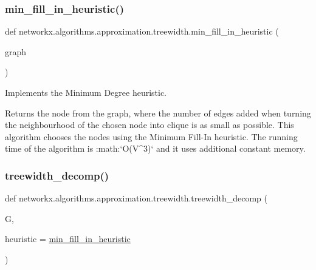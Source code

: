 \subsubsection{\texorpdfstring{min\+\_\+fill\+\_\+in\+\_\+heuristic()}{min\_fill\_in\_heuristic()}}
{\footnotesize\ttfamily def networkx.\+algorithms.\+approximation.\+treewidth.\+min\+\_\+fill\+\_\+in\+\_\+heuristic (\begin{DoxyParamCaption}\item[{}]{graph }\end{DoxyParamCaption})}

\begin{DoxyVerb}Implements the Minimum Degree heuristic.

Returns the node from the graph, where the number of edges added when
turning the neighbourhood of the chosen node into clique is as small as
possible. This algorithm chooses the nodes using the Minimum Fill-In
heuristic. The running time of the algorithm is :math:`O(V^3)` and it uses
additional constant memory.\end{DoxyVerb}
 \mbox{\label{namespacenetworkx_1_1algorithms_1_1approximation_1_1treewidth_a237be07bcad07dfb38016e0938bbfcfc}} 
\subsubsection{\texorpdfstring{treewidth\+\_\+decomp()}{treewidth\_decomp()}}
{\footnotesize\ttfamily def networkx.\+algorithms.\+approximation.\+treewidth.\+treewidth\+\_\+decomp (\begin{DoxyParamCaption}\item[{}]{G,  }\item[{}]{heuristic = {\ttfamily \hyperlink{namespacenetworkx_1_1algorithms_1_1approximation_1_1treewidth_a0bb0e946b540b4d1287654403c7e38ba}{min\+\_\+fill\+\_\+in\+\_\+heuristic}} }\end{DoxyParamCaption})}

